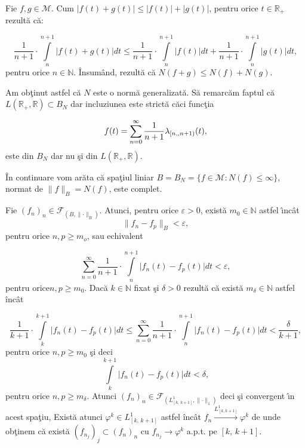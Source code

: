 \documentclass[ a4paper, 12pt]{report}
\theoremstyle{definition}
\theoremstyle{remark}
\numberwithin{equation}{section}
\begin{document}
Fie $f, g \in \mathcal{M}$. Cum $\lvert f(t) + g(t)\rvert \leq \lvert f(t)\rvert + \lvert g(t)\rvert$, pentru orice $t \in \mathbb{R}_+$ rezult\u a c\u a:

$$\frac{1}{n+1} \cdot \int\limits_{n}^{n+1}{\lvert f(t) + g(t) \rvert dt} \leq \frac{1}{n+1} \cdot \int\limits_{n}^{n+1}{\lvert f(t) \rvert dt} + \frac{1}{n+1} \cdot\int\limits_{n}^{n+1}{\lvert g(t) \rvert dt},$$ pentru orice $n \in \mathbb{N}$. \^ Insum\^ and, rezult\u a c\u a $N(f+g) \leq N(f) + N(g)$.

Am ob\c tinut astfel c\u a $N$ este o norm\u a generalizat\u a. S\u a remarc\u am faptul c\u a $ L(\mathbb{R}_+ , \mathbb{R}) \subset B_N$ dar incluziunea este strict\u a c\u aci func\c tia

$$f(t) = \sum\limits_{n = 0}^\infty \displaystyle\frac{1}{n + 1}\lambda_{[n, \\, n + 1)}(t),$$ este din $B_N$ dar nu \c si din $L(\mathbb{R}_+ , \mathbb{R})$.

\medskip

\^ In continuare vom ar\u ata c\u a spa\c tiul liniar
$B = B_N = \{f \in \mathcal{M} : N(f) \leq \infty\}$, normat de $\lVert f \rVert_B = N(f)$, este complet.

Fie $(f_n)_n \in \mathcal{F}_{(B, \lVert \cdot \rVert_B)}$. Atunci, pentru orice $\varepsilon > 0$, exist\u a $m_0 \in \mathbb{N}$ astfel \^\i nc\^ at
$$\lVert f_n - f_p \rVert_B < \varepsilon,$$  pentru orice $n,p \geq m_o$, sau echivalent

$$\sum\limits_{n=0}^{\infty}{ \frac{1}{n+1} \cdot\int\limits_{n}^{n+1}{\lvert f_n {(t)} - f_p{(t)} \rvert dt }} < \varepsilon,$$ pentru orice$n,p \geq m_0$. Dac\u a $k \in \mathbb{N}$ fixat \c si $\delta>0$ rezult\u a c\u a exist\u a $m_\delta \in \mathbb{N}$ astfel \^inc\^ at

$$\frac{1}{k+1}\cdot\int\limits_{k}^{k+1}{\lvert f_n {(t)} - f_p{(t)} \rvert dt}
\leq\sum\limits_{n=0}^{\infty}\frac{1}{n+1}\cdot\int\limits_{n}^{n+1}\lvert f_n{(t)}-f_p{(t)}\rvert dt < \frac{\delta}{k+1},$$ pentru orice $n,p \geq m_0$ \c si deci
$$\int\limits_{k}^{k+1}\lvert f_n({t})-f_p({t})\rvert dt<\delta,$$ pentru orice $n, p\geq m_\delta$. Atunci $(f_n)_n \in \mathcal{F}_{(L^1_{[k,\, k+1]}, \lVert \cdot \rVert_1)}$ deci \c si convergent \^\i n acest spa\c tiu, Exist\u a atunci $\varphi^k \in L^1_{[k,\, k+1]}$ astfel \^inc\^ at $f_n\xrightarrow{L^1_{[k,k+1]}} \varphi^k$ de unde ob\c tinem c\u a exist\u a $({f_{n_j}})_j\subset (f_n)_n$ cu $f_{n_j}\xrightarrow{}\varphi^k$ a.p.t. pe $[k,\, k+1]$.
\end{document}

